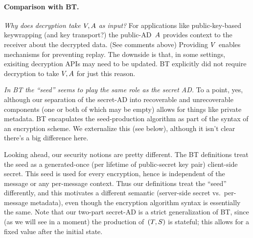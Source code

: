 \paragraph{Comparison with BT.}

\emph{Why does decryption take $V,A$ as input?} For applications like public-key-based keywrapping (and key transport?) the public-AD~$A$ provides context to the receiver about the decrypted data. (See comments above)  Providing $V$ enables mechanisms for preventing replay.    The downside is that, in some settings, exisiting decryption APIs may need to be updated.  BT explicitly did not require decryption to take $V,A$ for just this reason.

\emph{In BT the ``seed'' seems to play the same role as the secret AD.}  To a point, yes, although our separation of the secret-AD into recoverable and unrecoverable components (one or both of which may be empty) allows for things like private metadata.  BT encapulates the seed-production algorithm as part of the syntax of an encryption scheme.  We externalize this (see below), although it isn't clear there's a big difference here.

Looking ahead, our security notions are pretty different. The BT definitions treat the seed as a generated-once (per lifetime of public-secret key pair) client-side secret.  This seed is used for every encryption, hence is independent of the message or any per-message context.  Thus our definitions treat the ``seed'' differently, and this motivates a different semantic (server-side secret vs.\ per-message metadata), even though the encryption algorithm syntax is essentially the same.  Note that our two-part secret-AD is a strict generalization of BT, since (as we will see in a moment) the production of~$(T,S)$ is stateful; this allows for a fixed value after the initial state. 
